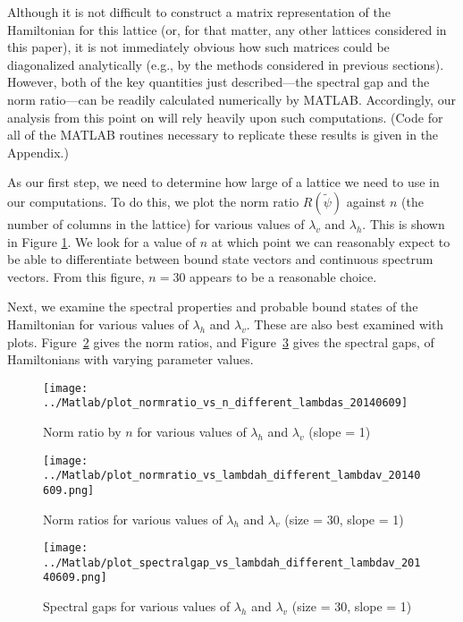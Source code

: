 \documentclass{article}
\numberwithin{equation}{section}
\numberwithin{theorem}{section}
\numberwithin{proposition}{section}
\numberwithin{lemma}{section}
\numberwithin{corollary}{section}
\numberwithin{definition}{section}
\begin{document}
Although it is not difficult to construct a matrix representation of the Hamiltonian for this lattice (or, for that matter, any other lattices considered in this paper), it is not immediately obvious how such matrices could be diagonalized analytically (e.g., by the methods considered in previous sections). However, both of the key quantities just described---the spectral gap and the norm ratio---can be readily calculated numerically by MATLAB. Accordingly, our analysis from this point on will rely heavily upon such computations. (Code for all of the MATLAB routines necessary to replicate these results is given in the Appendix.)

As our first step, we need to determine how large of a lattice we need to use in our computations. To do this, we plot the norm ratio $R(\widetilde{\psi})$ against $n$ (the number of columns in the lattice) for various values of $\lambda_v$ and $\lambda_h$. This is shown in Figure \ref{fig:45howbig}. We look for a value of $n$ at which point we can reasonably expect to be able to differentiate between bound state vectors and continuous spectrum vectors. From this figure, $n = 30$ appears to be a reasonable choice.

Next, we examine the spectral properties and probable bound states of the Hamiltonian for various values of $\lambda_h$ and $\lambda_v$. These are also best examined with plots. Figure~\ref{fig:45normratios} gives the norm ratios, and Figure~\ref{fig:45spectralgaps} gives the spectral gaps, of Hamiltonians with varying parameter values.

\begin{figure}[p!]
	\centering
	\caption{Norm ratio by $n$ for various values of $\lambda_h$ and $\lambda_v$ (slope = 1)	\label{fig:45howbig}}
	\texttt{[image: ../Matlab/plot\_normratio\_vs\_n\_different\_lambdas\_20140609]}	
\end{figure}
\begin{figure}[p!]
	\centering
	\caption{Norm ratios for various values of $\lambda_h$ and $\lambda_v$ (size = 30, slope = 1)	\label{fig:45normratios}}
	\texttt{[image: ../Matlab/plot\_normratio\_vs\_lambdah\_different\_lambdav\_20140609.png]}
\end{figure}

\begin{figure}[p!]
	\centering
	\caption{Spectral gaps for various values of $\lambda_h$ and $\lambda_v$ (size = 30, slope = 1)	\label{fig:45spectralgaps}}
	\texttt{[image: ../Matlab/plot\_spectralgap\_vs\_lambdah\_different\_lambdav\_20140609.png]}
\end{figure}
\end{document}
